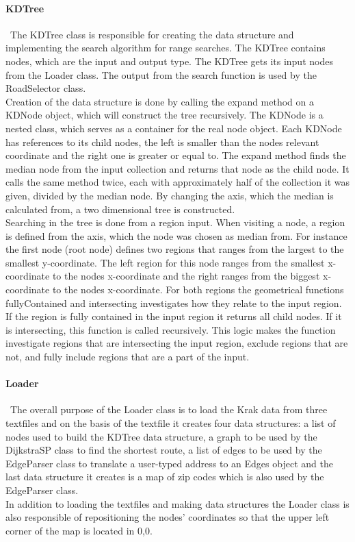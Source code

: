 \documentclass[a4paper,10pt,titlepage]{article}
\begin{document}
				\paragraph{KDTree}\mbox{}\
				The KDTree class is responsible for creating the data structure and implementing the search algorithm for range searches. The KDTree contains nodes, which are the input and output type. The KDTree gets its input nodes from the Loader class. The output from the search function is used by the RoadSelector class.\\
Creation of the data structure is done by calling the expand method on a KDNode object, which will construct the tree recursively. The KDNode is a nested class, which serves as a container for the real node object. Each KDNode has references to its child nodes, the left is smaller than the nodes relevant coordinate and the right one is greater or equal to. The expand method finds the median node from the input collection and returns that node as the child node. It calls the same method twice, each with approximately half of the collection it was given, divided by the median node. By changing the axis, which the median is calculated from, a two dimensional tree is constructed.\\
Searching in the tree is done from a region input. When visiting a node, a region is defined from the axis, which the node was chosen as median from. For instance the first node (root node) defines two regions that ranges from the largest to the smallest y-coordinate. The left region for this node ranges from the smallest x-coordinate to the nodes x-coordinate and the right ranges from the biggest x-coordinate to the nodes x-coordinate. For both regions the geometrical functions fullyContained and intersecting investigates how they relate to the input region. If the region is fully contained in the input region it returns all child nodes. If it is intersecting, this function is called recursively. This logic makes the function investigate regions that are intersecting the input region, exclude regions that are not, and fully include regions that are a part of the input.

				
				\paragraph{Loader}\mbox{}\
The overall purpose of the Loader class is to load the Krak data from three textfiles and on the basis of the textfile it creates four data structures: a list of nodes used to build the KDTree data structure, a graph to be used by the DijkstraSP class to find the shortest route, a list of edges to be used by the EdgeParser class to translate a user-typed address to an Edges object and the last data structure it creates is a map of zip codes which is also used by the EdgeParser class.\\
In addition to loading the textfiles and making data structures the Loader class is also responsible of repositioning the nodes' coordinates so that the upper left corner of the map is located in 0,0.
\end{document}
